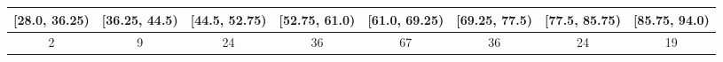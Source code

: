 \begin{tabular}{|c|c|c|c|c|c|c|c|}
    \hline
    \rule{0pt}{4ex} [28.0, 36.25) & [36.25, 44.5) & [44.5, 52.75) & [52.75, 61.0) & [61.0, 69.25) & [69.25, 77.5) & [77.5, 85.75) & [85.75, 94.0)\\
    \hline
    2 & 9 & 24 & 36 & 67 & 36 & 24 & 19\\
    \hline
    [1ex]
\end{tabular}